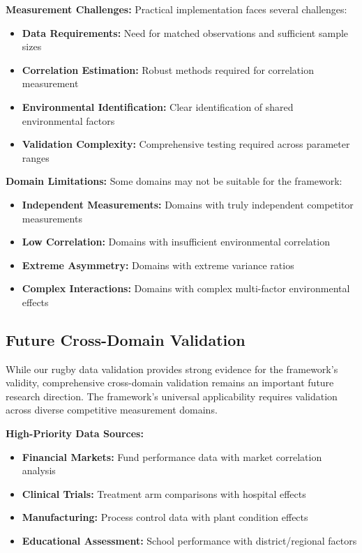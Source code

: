 \textbf{Measurement Challenges:}
Practical implementation faces several challenges:
\begin{itemize}
    \item \textbf{Data Requirements:} Need for matched observations and sufficient sample sizes
    \item \textbf{Correlation Estimation:} Robust methods required for correlation measurement
    \item \textbf{Environmental Identification:} Clear identification of shared environmental factors
    \item \textbf{Validation Complexity:} Comprehensive testing required across parameter ranges
\end{itemize}

\textbf{Domain Limitations:}
Some domains may not be suitable for the framework:
\begin{itemize}
    \item \textbf{Independent Measurements:} Domains with truly independent competitor measurements
    \item \textbf{Low Correlation:} Domains with insufficient environmental correlation
    \item \textbf{Extreme Asymmetry:} Domains with extreme variance ratios
    \item \textbf{Complex Interactions:} Domains with complex multi-factor environmental effects
\end{itemize}

\subsection{Future Cross-Domain Validation}

While our rugby data validation provides strong evidence for the framework's validity, comprehensive cross-domain validation remains an important future research direction. The framework's universal applicability requires validation across diverse competitive measurement domains.

\textbf{High-Priority Data Sources:}
\begin{itemize}
    \item \textbf{Financial Markets:} Fund performance data with market correlation analysis
    \item \textbf{Clinical Trials:} Treatment arm comparisons with hospital effects
    \item \textbf{Manufacturing:} Process control data with plant condition effects
    \item \textbf{Educational Assessment:} School performance with district/regional factors
\end{itemize}

